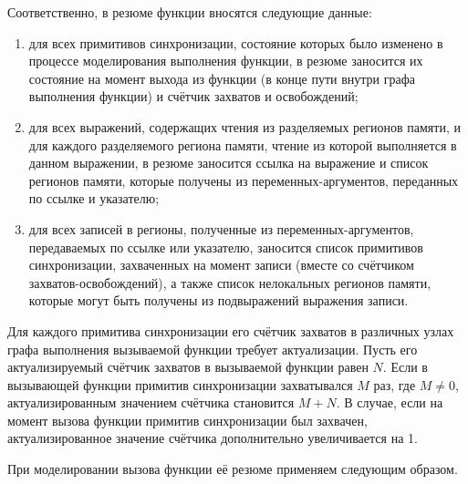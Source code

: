 Соответственно, в резюме функции вносятся следующие данные:

\begin{enumerate}
 \item для всех примитивов синхронизации, состояние которых было изменено в процессе моделирования выполнения функции, в резюме заносится их состояние на момент выхода из функции (в конце пути внутри графа выполнения функции) и счётчик захватов и освобождений;
 \item для всех выражений, содержащих чтения из разделяемых регионов памяти, и для каждого разделяемого региона памяти, чтение из которой выполняется в данном выражении, в резюме заносится ссылка на выражение и список регионов памяти, которые получены из переменных-аргументов, переданных по ссылке и указателю;
 \item для всех записей в регионы, полученные из переменных-аргументов, передаваемых по ссылке или указателю, заносится список примитивов синхронизации, захваченных на момент записи (вместе со счётчиком захватов-освобождений), а также список нелокальных регионов памяти, которые могут быть получены из подвыражений выражения записи.
\end{enumerate}

Для каждого примитива синхронизации его счётчик захватов в различных узлах графа выполнения вызываемой функции требует актуализации. Пусть его актуализируемый счётчик захватов в вызываемой функции равен $N$. Если в вызывающей функции примитив синхронизации захватывался $M$ раз, где $M \neq 0$, актуализированным значением счётчика становится $M + N$. В случае, если на момент вызова функции примитив синхронизации был захвачен, актуализированное значение счётчика дополнительно увеличивается на 1.

При моделировании вызова функции её резюме применяем следующим образом.

